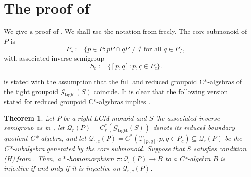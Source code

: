 \documentclass[12pt]{amsart}
\newtheorem{thm}{Theorem}[section]
\theoremstyle{definition}
\theoremstyle{remark}
\numberwithin{equation}{section}
\newcommand{\Q}{\mathcal{Q}}
\newcommand{\gt}{\mathcal{G}_{\text{tight}}}
\begin{document}
\section{The proof of \cite[Theorem~4.1]{St22}}

We give a proof of \cite[Theorem~4.1]{St22}. We shall use the notation from \cite{St22} freely. The core submonoid of $P$ is
\[
P_c:=\{p\in P : pP\cap qP\neq\emptyset\text{ for all } q\in P\},
\]
with associated inverse semigroup 
\[
S_c:=\{[p,q] : p,q\in P_c\}.
\]

\cite[Theorem~4.1]{St22} is stated with the assumption that the full and reduced groupoid C*-algebras of the tight groupoid $\gt(S)$ coincide. It is clear that the following version stated for reduced groupoid C*-algebras implies \cite[Theorem~4.1]{St22}.

\begin{thm}
\label{thm}
Let $P$ be a right LCM monoid and $S$ the associated inverse semigroup as in \cite[Proposition~3.2]{StLCM}, let $\Q_r(P)= C^*_r(\gt(S))$ denote its reduced boundary quotient C*-algebra, and let $\Q_{r,c}(P) = C^*(T_{[p,q]}: p,q\in P_c)\subseteq \Q_r(P)$ be the C*-subalgebra generated by the core submonoid. Suppose that $S$ satisfies condition (H) from \cite[Definition~3.1]{St22}. Then, a $*$-homomorphism $\pi: \Q_r(P)\to B$ to a C*-algebra $B$ is injective if and only if it is injective on $\Q_{r,c}(P)$. 	
\end{thm}
\end{document}
